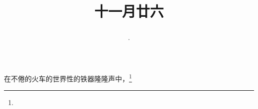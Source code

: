 \title{\date[d=7,m=1,y=2024][year:cn-y,年,month:cn,day:cn,日,·,weekday]·十一月廿六 }
在不倦的火车的世界性的铁器隆隆声中，\footnote{ }

